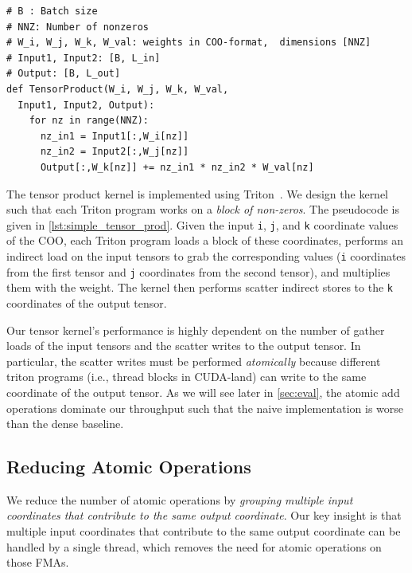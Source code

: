 \documentclass[conference]{IEEEtran}
\begin{document}
\begin{lstlisting}[caption={Hash table lookup code.}, label={lst:simple_tensor_prod}, style=custompython]
# B : Batch size
# NNZ: Number of nonzeros
# W_i, W_j, W_k, W_val: weights in COO-format,  dimensions [NNZ]
# Input1, Input2: [B, L_in]
# Output: [B, L_out]
def TensorProduct(W_i, W_j, W_k, W_val, 
  Input1, Input2, Output):
    for nz in range(NNZ):
      nz_in1 = Input1[:,W_i[nz]]
      nz_in2 = Input2[:,W_j[nz]]
      Output[:,W_k[nz]] += nz_in1 * nz_in2 * W_val[nz]
\end{lstlisting}

The tensor product kernel is implemented using Triton~\cite{b1}.
We design the kernel such that each Triton program works on a \textit{block of non-zeros}.
The pseudocode is given in \autoref{lst:simple_tensor_prod}.
Given the input \texttt{i}, \texttt{j}, and \texttt{k} coordinate values of the COO,
each Triton program loads a block of these coordinates,
performs an indirect load on the input tensors to grab the corresponding values
(\texttt{i} coordinates from the first tensor and \texttt{j} coordinates from the second tensor),
and multiplies them with the weight.
The kernel then performs scatter indirect stores to the \texttt{k} coordinates
of the output tensor.

Our tensor kernel's performance is highly dependent on the number of gather loads of the input tensors
and the scatter writes to the output tensor.
In particular, the scatter writes must be performed \textit{atomically} because different triton programs (i.e., thread blocks in CUDA-land) can write to the same coordinate of the output tensor.
As we will see later in \autoref{sec:eval}, the atomic add operations dominate our throughput such that the naive implementation is worse than the dense baseline.

\subsection{Reducing Atomic Operations}
\label{sec:impl:block}

We reduce the number of atomic operations by \textit{grouping multiple input coordinates that contribute to the same output coordinate}.
Our key insight is that multiple input coordinates that contribute to the same output coordinate can be handled by a single thread,
which removes the need for atomic operations on those FMAs.
\end{document}
